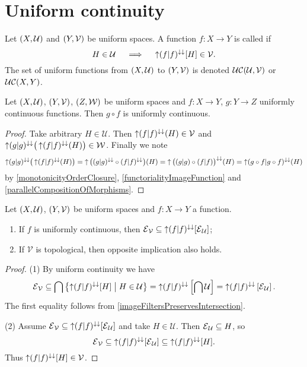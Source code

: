 \section{Uniform continuity}
\begin{definition}
Let $\left( X,\mathcal{U} \right)$ and $\left( Y,\mathcal{V} \right)$ be uniform spaces. A function $f: X\to Y$ is called  if
\[ H\in \mathcal{U} \quad\implies\quad \operatorname{\uparrow} (f|f)^{\downarrow\downarrow}[H]\in \mathcal{V}. \]
The set of uniform functions from $\left( X,\mathcal{U} \right)$ to $\left( Y,\mathcal{V} \right)$ is denoted $\operatorname{\mathcal{UC}}(\mathcal{U}, \mathcal{V})$ or $\operatorname{\mathcal{UC}}(X,Y)$.
\end{definition}

\begin{lemma} \label{compositionUniformlyContinuousFunctions}
Let $\left( X,\mathcal{U} \right)$, $\left( Y,\mathcal{V} \right)$, $\left( Z, \mathcal{W} \right)$ be uniform spaces and $f:X\to Y$, $g:Y\to Z$ uniformly continuous functions. Then $g\circ f$ is uniformly continuous.
\end{lemma}
\begin{proof}
Take arbitrary $H \in \mathcal{U}$. Then $\operatorname{\uparrow} (f|f)^{\downarrow\downarrow}(H)\in \mathcal{V}$ and $\operatorname{\uparrow}(g|g)^{\downarrow\downarrow}\big(\operatorname{\uparrow} (f|f)^{\downarrow\downarrow}(H)\big) \in \mathcal{W}$. Finally we note
\[ \operatorname{\uparrow}(g|g)^{\downarrow\downarrow}\big(\operatorname{\uparrow} (f|f)^{\downarrow\downarrow}(H)\big) = \operatorname{\uparrow}\big((g|g)^{\downarrow\downarrow}\circ (f|f)^{\downarrow\downarrow}\big)(H) = \operatorname{\uparrow} \big((g|g)\circ (f|f)\big)^{\downarrow\downarrow}(H) = \operatorname{\uparrow} (g\circ f|g\circ f)^{\downarrow\downarrow}(H) \]
by \ref{monotonicityOrderClosure}, \ref{functorialityImageFunction} and \ref{parallelCompositionOfMorphisms}.
\end{proof}

\begin{proposition} \label{uniformContinuityEntourages}
Let $\left( X,\mathcal{U} \right)$, $\left( Y,\mathcal{V} \right)$ be uniform spaces and $f: X\to Y$ a function.
\begin{enumerate}
\item If $f$ is uniformly continuous, then $\operatorname{\mathcal{E}}_\mathcal{V} \subseteq \operatorname{\uparrow} (f|f)^{\downarrow\downarrow}[\operatorname{\mathcal{E}}_\mathcal{U}]$;
\item If $\mathcal{V}$ is topological, then opposite implication also holds.
\end{enumerate}
\end{proposition}
\begin{proof}
(1) By uniform continuity we have
\[ \operatorname{\mathcal{E}}_\mathcal{V} \subseteq \bigcap\left\{ \operatorname{\uparrow} (f|f)^{\downarrow\downarrow}[H] \;\middle|\; H\in \mathcal{U} \right\} = \operatorname{\uparrow} (f|f)^{\downarrow\downarrow}\left[\bigcap \mathcal{U}\right] = \operatorname{\uparrow} (f|f)^{\downarrow\downarrow}\left[\operatorname{\mathcal{E}}_\mathcal{U}\right]. \]
The first equality follows from \ref{imageFiltersPreservesIntersection}.

(2) Assume $\operatorname{\mathcal{E}}_\mathcal{V} \subseteq \operatorname{\uparrow} (f|f)^{\downarrow\downarrow}[\operatorname{\mathcal{E}}_\mathcal{U}]$ and take $H\in \mathcal{U}$. Then $\operatorname{\mathcal{E}}_\mathcal{U}\subseteq H$, so
\[ \operatorname{\mathcal{E}}_\mathcal{V} \subseteq \operatorname{\uparrow} (f|f)^{\downarrow\downarrow}[\operatorname{\mathcal{E}}_\mathcal{U}] \subseteq \operatorname{\uparrow} (f|f)^{\downarrow\downarrow}[H]. \]
Thus $\operatorname{\uparrow} (f|f)^{\downarrow\downarrow}[H] \in\mathcal{V}$.
\end{proof}

